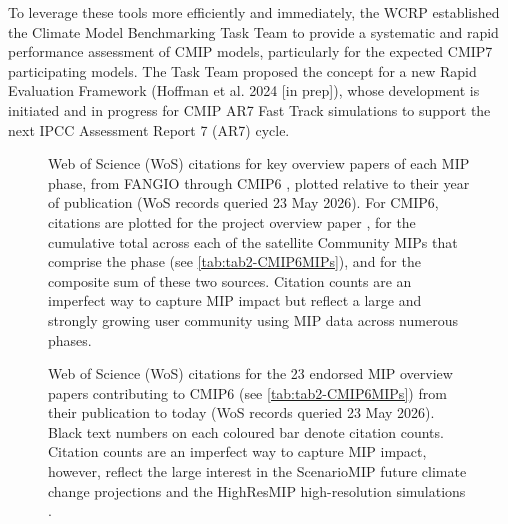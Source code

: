 \documentclass[manuscript]{copernicus}
\begin{document}
{To leverage these tools more efficiently and immediately, the WCRP established the Climate Model Benchmarking Task Team to provide a systematic and rapid performance assessment of CMIP models, particularly for the expected CMIP7 participating models. The Task Team proposed the concept for a new Rapid Evaluation Framework (Hoffman et al. 2024 [in prep]), whose development is initiated and in progress for CMIP AR7 Fast Track simulations to support the next IPCC Assessment Report 7 (AR7) cycle.
}


\begin{figure}
    \centering
    
    \caption{Web of Science (WoS) citations for key overview papers of each MIP phase, from FANGIO \citep{cess_intercomparison_1990} through CMIP6 \citep{eyring_overview_2016}, plotted relative to their year of publication (WoS records queried 23 May 2026). For CMIP6, citations are plotted for the project overview paper \citep{eyring_overview_2016}, for the cumulative total across each of the satellite Community MIPs that comprise the phase (see \autoref{tab:tab2-CMIP6MIPs}), and for the composite sum of these two sources. Citation counts are an imperfect way to capture MIP impact but reflect a large and strongly growing user community using MIP data across numerous phases.}
    \label{fig:fig3-MIPPhaseCitations}
\end{figure}


\begin{figure}
    \centering
    
    \caption{Web of Science (WoS) citations for the 23 endorsed MIP overview papers contributing to CMIP6 (see \autoref{tab:tab2-CMIP6MIPs}) from their publication to today (WoS records queried 23 May 2026). Black text numbers on each coloured bar denote citation counts. Citation counts are an imperfect way to capture MIP impact, however, reflect the large interest in the ScenarioMIP future climate change projections \citep{oneill_scenario_2016} and the HighResMIP high-resolution simulations \citep{haarsma_high_2016}.}
    \label{fig:fig4-MIPCitations}
\end{figure}
\end{document}
